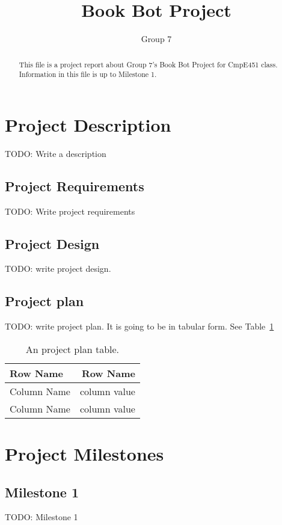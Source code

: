 \documentclass[a4paper]{article}
\title{Book Bot Project}
\author{Group 7}
\begin{document}
\maketitle

\begin{abstract}
This file is a project report about Group 7's Book Bot Project for CmpE451 class. Information in this file is up to Milestone 1.
\end{abstract}

\section{Project Description}

TODO: Write a description

\subsection{Project Requirements}

TODO: Write project requirements

\subsection{Project Design}

TODO: write project design.

\subsection{Project plan}

TODO: write project plan. It is going to be in tabular form. See Table~\ref{tab:projectplan}

\begin{table}
\centering
\begin{tabular}{l|r}
Row Name & Row Name \\\hline
Column Name & column value \\
Column Name & column value
\end{tabular}
\caption{\label{tab:projectplan}An project plan table.}
\end{table}

\section{Project Milestones}
\subsection{Milestone 1}
TODO: Milestone 1
\end{document}
